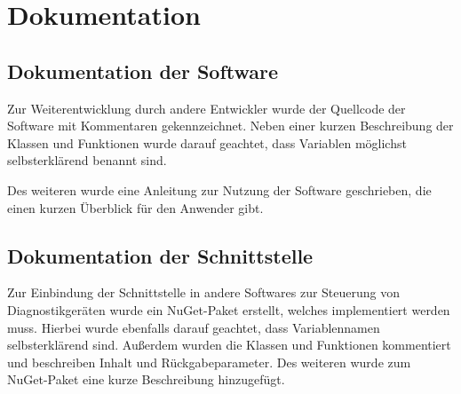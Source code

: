 \section{Dokumentation}
\label{sec:Dokumentation}

\subsection{Dokumentation der Software}
\label{sec:DokumentationSoftware}
Zur Weiterentwicklung durch andere Entwickler wurde der Quellcode der Software mit Kommentaren gekennzeichnet. Neben einer kurzen Beschreibung der Klassen und Funktionen wurde darauf geachtet, dass Variablen möglichst selbsterklärend benannt sind.

Des weiteren wurde eine Anleitung zur Nutzung der Software geschrieben, die einen kurzen Überblick für den Anwender gibt.

\subsection{Dokumentation der Schnittstelle}
\label{sec:DokumentationSchnittstelle}
Zur Einbindung der Schnittstelle in andere Softwares zur Steuerung von Diagnostikgeräten wurde ein {\acs{NuGet}}-Paket erstellt, welches implementiert werden muss. Hierbei wurde ebenfalls darauf geachtet, dass Variablennamen selbsterklärend sind. Außerdem wurden die Klassen und Funktionen kommentiert und beschreiben Inhalt und Rückgabeparameter. Des weiteren wurde zum {\acs{NuGet}}-Paket eine kurze Beschreibung hinzugefügt.
